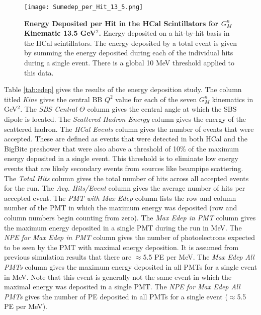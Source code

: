 \documentclass[10pt]{article}
\begin{document}
	\begin{figure}[!ht]
	\begin{center}
	\texttt{[image: Sumedep\_per\_Hit\_13\_5.png]}
	\end{center}
	\caption{
	{\bf{Energy Deposited per Hit in the HCal Scintillators for $G_M^n$ Kinematic 13.5 GeV$^2$.}} Energy deposited on a hit-by-hit basis in the HCal scintillators. The energy deposited by a total event is given by summing the energy deposited during each of the individual hits during a single event. There is a global 10 MeV threshold applied to this data.}
	\label{fig:sumedep}
	\end{figure}	

Table \ref{tab:edep} gives the results of the energy deposition study. The column titled \textit{Kine} gives the central BB $Q^2$ value for each of the seven $G_M^n$ kinematics in GeV$^2$. The \textit{SBS Central $\Theta$} column gives the central angle at which the SBS dipole is located. The \textit{Scattered Hadron Energy} column gives the energy of the scattered hadron. The \textit{HCal Events} column gives the number of events that were accepted. These are defined as events that were detected in both HCal and the BigBite preshower that were also above a threshold of 10\% of the maximum energy deposited in a single event. This threshold is to eliminate low energy events that are likely secondary events from sources like beampipe scattering. The \textit{Total Hits} column gives the total number of hits across all accepted events for the run. The \textit{Avg. Hits/Event} column gives the average number of hits per accepted event. The \textit{PMT with Max Edep} column lists the row and column number of the PMT in which the maximum energy was deposited (row and column numbers begin counting from zero). The \textit{Max Edep in PMT} column gives the maximum energy deposited in a single PMT during the run in MeV. The \textit{NPE for Max Edep in PMT} column gives the number of photoelectrons expected to be seen by the PMT with maximal energy deposition. It is assumed from previous simulation results that there are $\approx$5.5 PE per MeV. The \textit{Max Edep All PMTs} column gives the maximum energy deposited in all PMTs for a single event in MeV. Note that this event is generally not the same event in which the maximal energy was deposited in a single PMT. The \textit{NPE for Max Edep All PMTs} gives the number of PE deposited in all PMTs for a single event ($\approx$5.5 PE per MeV). 
\vspace{3mm}
\end{document}
